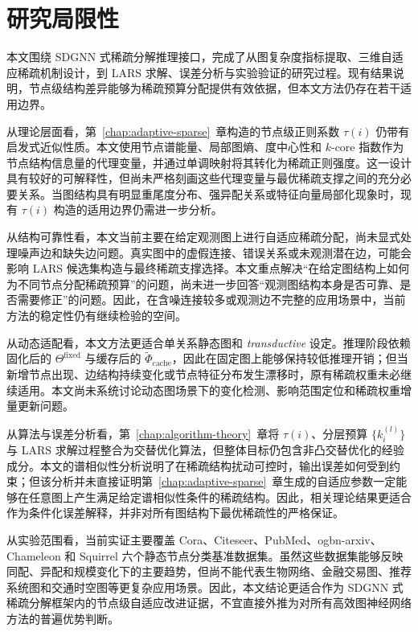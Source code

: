 \section{研究局限性}\label{sec:ch7-limitations}

本文围绕 SDGNN 式稀疏分解推理接口，完成了从图复杂度指标提取、三维自适应稀疏机制设计，到 LARS 求解、误差分析与实验验证的研究过程。现有结果说明，节点级结构差异能够为稀疏预算分配提供有效依据，但本文方法仍存在若干适用边界。

从理论层面看，第~\ref{chap:adaptive-sparse}~章构造的节点级正则系数 $\tau(i)$ 仍带有启发式近似性质。本文使用节点谱能量、局部图熵、度中心性和 $k$-core 指数作为节点结构信息量的代理变量，并通过单调映射将其转化为稀疏正则强度。这一设计具有较好的可解释性，但尚未严格刻画这些代理变量与最优稀疏支撑之间的充分必要关系。当图结构具有明显重尾度分布、强异配关系或特征向量局部化现象时，现有 $\tau(i)$ 构造的适用边界仍需进一步分析。

从结构可靠性看，本文当前主要在给定观测图上进行自适应稀疏分配，尚未显式处理噪声边和缺失边问题。真实图中的虚假连接、错误关系或未观测潜在边，可能会影响 LARS 候选集构造与最终稀疏支撑选择。本文重点解决“在给定图结构上如何为不同节点分配稀疏预算”的问题，尚未进一步回答“观测图结构本身是否可靠、是否需要修正”的问题。因此，在含噪连接较多或观测边不完整的应用场景中，当前方法的稳定性仍有继续检验的空间。

从动态适配看，本文方法更适合单关系静态图和 \emph{transductive} 设定。推理阶段依赖固化后的 $\Theta^{\mathrm{fixed}}$ 与缓存后的 $\tilde{\Phi}_{\mathrm{cache}}$，因此在固定图上能够保持较低推理开销；但当新增节点出现、边结构持续变化或节点特征分布发生漂移时，原有稀疏权重未必继续适用。本文尚未系统讨论动态图场景下的变化检测、影响范围定位和稀疏权重增量更新问题。

从算法与误差分析看，第~\ref{chap:algorithm-theory}~章将 $\tau(i)$、分层预算 $\{k_i^{(l)}\}$ 与 LARS 求解过程整合为交替优化算法，但整体目标仍包含非凸交替优化的经验成分。本文的谱相似性分析说明了在稀疏结构扰动可控时，输出误差如何受到约束；但该分析并未直接证明第~\ref{chap:adaptive-sparse}~章生成的自适应参数一定能够在任意图上产生满足给定谱相似性条件的稀疏结构。因此，相关理论结果更适合作为条件化误差解释，并非对所有图结构下最优稀疏性的严格保证。

从实验范围看，当前实证主要覆盖 Cora、Citeseer、PubMed、ogbn-arxiv、Chameleon 和 Squirrel 六个静态节点分类基准数据集。虽然这些数据集能够反映同配、异配和规模变化下的主要趋势，但尚不能代表生物网络、金融交易图、推荐系统图和交通时空图等更复杂应用场景。因此，本文结论更适合作为 SDGNN 式稀疏分解框架内的节点级自适应改进证据，不宜直接外推为对所有高效图神经网络方法的普遍优势判断。

